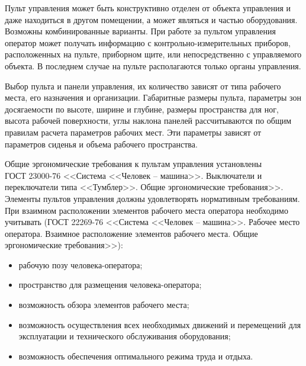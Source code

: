         Пульт управления может быть конструктивно отделен от объекта управления
        и даже находиться в другом помещении, а может являться и частью
        оборудования. Возможны комбинированные варианты. При работе за пультом
        управления оператор может получать информацию с
        контрольно-измерительных приборов, расположенных на пульте, приборном
        щите, или непосредственно с управляемого объекта. В последнем случае на
        пульте располагаются только органы управления. 

        Выбор пульта и панели управления, их количество зависят от типа
        рабочего места, его назначения и организации. Габаритные размеры
        пульта, параметры зон досягаемости по высоте, ширине и глубине, размеры
        пространства для ног, высота рабочей поверхности, углы наклона панелей
        рассчитываются по общим правилам расчета параметров рабочих мест. Эти
        параметры зависят от параметров сиденья и объема рабочего пространства.

        Общие эргономические требования к пультам управления установлены \\
        ГОСТ 23000-76 <<Система <<Человек -- машина>>. Выключатели и
        переключатели типа <<Тумблер>>. Общие эргономические требования>>.
        Элементы пультов управления должны удовлетворять нормативным
        требованиям. При взаимном расположении элементов рабочего места
        оператора необходимо учитывать (ГОСТ 22269-76 <<Система <<Человек –
        машина>>. Рабочее место оператора.  Взаимное расположение элементов
        рабочего места. Общие эргономические требования>>):

        \begin{itemize}
            \item рабочую позу человека-оператора;
            \item пространство для размещения человека-оператора;
            \item возможность обзора элементов рабочего места;
            \item возможность осуществления всех необходимых движений
                и перемещений для эксплуатации и технического обслуживания
                оборудования;
            \item возможность обеспечения оптимального режима труда и отдыха.
        \end{itemize}

